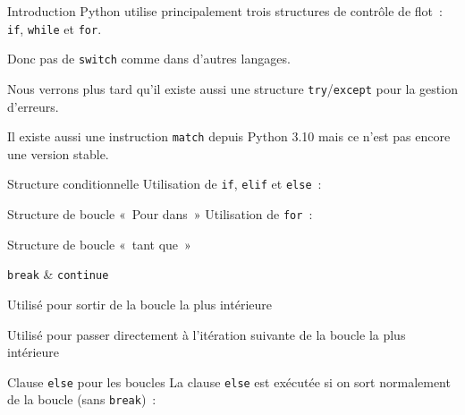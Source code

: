 \begin{frame}{Introduction}
  Python utilise principalement trois structures de contrôle de flot~: \texttt{if}, \texttt{while} et \texttt{for}.

  Donc pas de \texttt{switch} comme dans d'autres langages.

  Nous  verrons plus tard qu'il existe aussi une structure \texttt{try}/\texttt{except} pour la gestion d'erreurs.

  Il existe aussi une instruction \texttt{match} depuis Python 3.10 mais ce n'est pas encore une version stable.
\end{frame}

\begin{frame}{Structure conditionnelle}
  Utilisation de \texttt{if}, \texttt{elif} et \texttt{else}~:
\end{frame}

\begin{frame}{Structure de boucle «~Pour dans~»}
  Utilisation de \texttt{for}~:
\end{frame}

\begin{frame}{Structure de boucle «~tant que~»}
\end{frame}

\begin{frame}{\texttt{break} \& \texttt{continue}}
  \begin{description}[<+->]
    \item[\texttt{break}] Utilisé pour sortir de la boucle la plus intérieure
    \item[\texttt{continue}] Utilisé pour passer directement à l'itération suivante de la boucle la plus intérieure
  \end{description}

\end{frame}

\begin{frame}{Clause \texttt{else} pour les boucles}
  La clause \texttt{else} est exécutée si on sort normalement de la boucle (sans \texttt{break})~:

\end{frame}
